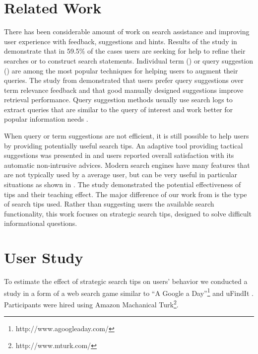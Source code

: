 \documentclass{sig-alternate}
\begin{document}
\section{Related Work}

There has been considerable amount of work on search assistance and improving user experience with feedback, suggestions and hints.
Results of the study in \cite{xie2009understanding} demonstrate that in 59.5\% of the cases users are seeking for help to refine their searches or to construct search statements.
Individual term (\cite{ruthven2003survey}) or query suggestion (\cite{Bhatia:2011:QSA:2009916.2010023, Cao:2008:CQS:1401890.1401995,Jones:2006:GQS:1135777.1135835}) are among the most popular techniques for helping users to augment their queries.
The study from \cite{Kelly:2009:CQT:1571941.1572006} demonstrated that users prefer query suggestions over term relevance feedback and that good manually designed suggestions improve retrieval performance.
Query suggestion methods usually use search logs to extract queries that are similar to the query of interest and work better for popular information needs \cite{Bhatia:2011:QSA:2009916.2010023}.

When query or term suggestions are not efficient, it is still possible to help users by providing potentially useful search tips.
An adaptive tool providing tactical suggestions was presented in \cite{Kriewel2010} and users reported overall satisfaction with its automatic non-intrusive advices.
Modern searc\setlength{\floatsep}{3pt plus 1.0pt minus 1.0pt}h engines have many features that are not typically used by a average user, but can be very useful in particular situations as shown in \cite{Moraveji:2011:MIU:2009916.2009966}. The study demonstrated the potential effectiveness of tips and their teaching effect.
The major difference of our work from \cite{Moraveji:2011:MIU:2009916.2009966} is the type of search tips used.
Rather than suggesting users the available search functionality, this work focuses on strategic search tips, designed to solve difficult informational questions.

\section{User Study}

To estimate the effect of strategic search tips on users' behavior we conducted a study in a form of a web search game similar to ``A Google a Day''\footnote{http://www.agoogleaday.com/} and uFindIt \cite{Ageev:2011:FYG:2009916.2009965}. Participants were hired using Amazon Machanical Turk\footnote{http://www.mturk.com/}. 
\end{document}
